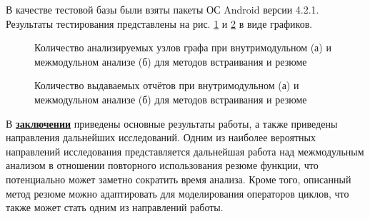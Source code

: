В качестве тестовой базы были взяты пакеты ОС Android версии 4.2.1. Результаты тестирования представлены на рис. \ref{img:nodes} и \ref{img:defects} в виде графиков.

\begin{figure}[ht]
  \begin{minipage}[ht]{0.49\linewidth}
  \end{minipage}
  \hfill
  \begin{minipage}[ht]{0.49\linewidth}
  \end{minipage}
  \caption{Количество анализируемых узлов графа при внутримодульном (а) и межмодульном анализе (б) для методов встраивания и резюме}
  \label{img:nodes}  
\end{figure}


\begin{figure}[ht]
  \begin{minipage}[ht]{0.49\linewidth}
  \end{minipage}
  \hfill
  \begin{minipage}[ht]{0.49\linewidth}
  \end{minipage}
  \caption{Количество выдаваемых отчётов при внутримодульном (а) и межмодульном анализе (б) для методов встраивания и резюме}
  \label{img:defects}  
\end{figure}

В \underline{\textbf{заключении}} приведены основные результаты работы, а также приведены направления дальнейших исследований. Одним из наиболее вероятных направлений исследования представляется дальнейшая работа над межмодульным анализом в отношении повторного использования резюме функции, что потенциально может заметно сократить время анализа. Кроме того, описанный метод резюме можно адаптировать для моделирования операторов циклов, что также может стать одним из направлений работы.


